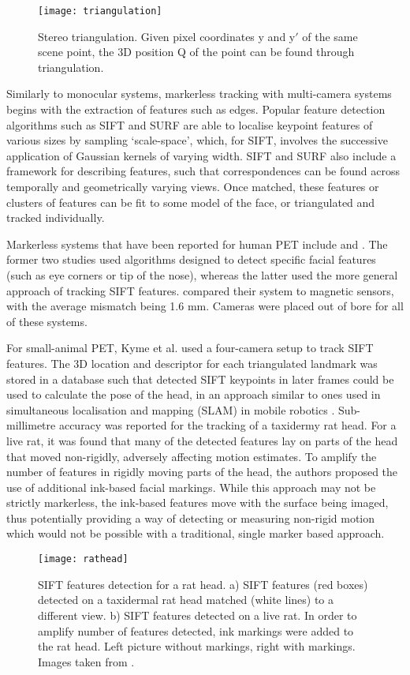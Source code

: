 \documentclass[class=article, crop=false]{standalone}
\begin{document}
\begin{figure}
	\centering
	\texttt{[image: triangulation]}
	\caption{Stereo triangulation. Given pixel coordinates y and y$'$ of the same scene point, the 3D position Q of the point can be found through triangulation.}
	\label{triangulation}
\end{figure}

\par 
Similarly to monocular systems, markerless tracking with multi-camera systems begins with the extraction of features such as edges. Popular feature detection algorithms such as SIFT \parencite{Lowe2004} and SURF \parencite{Bay2008} are able to localise keypoint features of various sizes by sampling `scale-space', which, for SIFT, involves the successive application of Gaussian kernels of varying width. SIFT and SURF  also include a framework for describing features, such that correspondences can be found across temporally and geometrically varying views. Once matched, these features or clusters of features can be fit to some model of the face, or triangulated and tracked individually.
\par 
Markerless systems that have been reported for human PET include \cite{Anishchenko2015,Gao2007} and \cite{Ma2008}. The former two studies used algorithms designed to detect specific facial features (such as eye corners or tip of the nose), whereas the latter used the more general approach of tracking SIFT features. \cite{Anishchenko2015} compared their system to magnetic sensors, with the average mismatch being 1.6 mm. Cameras were placed out of bore for all of these systems.
\par
For small-animal PET, Kyme et al. \parencite*{Kyme2014} used a four-camera setup to track SIFT features. The 3D location and descriptor for each triangulated landmark was stored in a database such that detected SIFT keypoints in later frames could be used to calculate the pose of the head, in an approach similar to ones used in simultaneous localisation and mapping (SLAM) in mobile robotics \parencite{Se2002,Se2005}. Sub-millimetre accuracy was reported for the tracking of a taxidermy rat head. For a live rat, it was found that many of the detected features lay on parts of the head that moved non-rigidly, adversely affecting motion estimates. To amplify the number of features in rigidly moving parts of the head, the authors proposed the use of additional ink-based facial markings. While this approach may not be strictly markerless, the ink-based features move with the surface being imaged, thus potentially providing a way of detecting or measuring non-rigid motion which would not be possible with a traditional, single marker based approach.

\begin{figure}
	\centering
	\texttt{[image: rathead]}
	\caption{SIFT features detection for a rat head. a) SIFT features (red boxes) detected on a taxidermal rat head matched (white lines) to a different view. b) SIFT features detected on a live rat. In order to amplify number of features detected, ink markings were added to the rat head. Left picture without markings, right with markings. Images taken from \parencite{Kyme2014}.}
	\label{rathead}
\end{figure}
\end{document}
